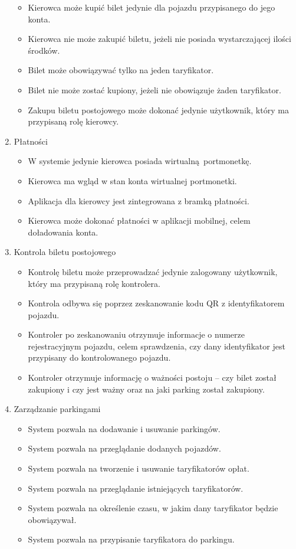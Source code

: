 \begin{enumerate}
\begin{itemize}
			\item Kierowca może kupić bilet jedynie dla pojazdu przypisanego do jego konta.
			\item Kierowca nie może zakupić biletu, jeżeli nie posiada wystarczającej ilości środków.
			\item Bilet może obowiązywać tylko na jeden taryfikator.
			\item Bilet nie może zostać kupiony, jeżeli nie obowiązuje żaden taryfikator.
			\item Zakupu biletu postojowego może dokonać jedynie użytkownik, który ma przypisaną rolę kierowcy.
		\end{itemize}
	\item Płatności
		\begin{itemize}
			\item W systemie jedynie kierowca posiada wirtualną portmonetkę.
			\item Kierowca ma wgląd w stan konta wirtualnej portmonetki.
			\item Aplikacja dla kierowcy jest zintegrowana z bramką płatności.
			\item Kierowca może dokonać płatności w aplikacji mobilnej, celem doładowania konta.
		\end{itemize}
	\item Kontrola biletu postojowego
		\begin{itemize}
			\item Kontrolę biletu może przeprowadzać jedynie zalogowany użytkownik, który ma przypisaną rolę kontrolera.
			\item Kontrola odbywa się poprzez zeskanowanie kodu QR z identyfikatorem pojazdu.
			\item Kontroler po zeskanowaniu otrzymuje informacje o numerze rejestracyjnym pojazdu, celem sprawdzenia, czy dany identyfikator jest przypisany do kontrolowanego pojazdu.
			\item Kontroler otrzymuje informację o ważności postoju -- czy bilet został zakupiony i czy jest ważny oraz na jaki parking został zakupiony.
		\end{itemize}
	\item Zarządzanie parkingami
		\begin{itemize}
			\item System pozwala na dodawanie i usuwanie parkingów.
			\item System pozwala na przeglądanie dodanych pojazdów.
			\item System pozwala na tworzenie i usuwanie taryfikatorów opłat.
			\item System pozwala na przeglądanie istniejących taryfikatorów.
			\item System pozwala na określenie czasu, w jakim dany taryfikator będzie obowiązywał.
			\item System pozwala na przypisanie taryfikatora do parkingu.
		\end{itemize}
\end{enumerate}


